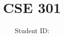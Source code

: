 \documentclass{article}
\title{CSE 301}
\author{\studentname \qquad Student ID: \suid}
\begin{document}


\pagebreak

\pagebreak

\pagebreak

\pagebreak

\end{document}

